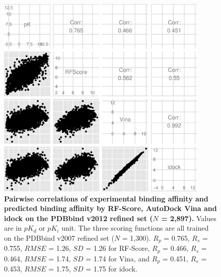 \documentclass[10pt]{article}
\begin{document}
\begin{figure}[!ht]
\begin{center}
\includegraphics[width=4in]{../istar/PDBbind2012Correlations.eps}
\end{center}
\caption{
{\bf Pairwise correlations of experimental binding affinity and predicted binding affinity by RF-Score, AutoDock Vina and idock on the PDBbind v2012 refined set ($N$ = 2,897).} Values are in $pK_d$ or $pK_i$ unit. The three scoring functions are all trained on the PDBbind v2007 refined set ($N$ = 1,300). $R_p$ = 0.765, $R_s$ = 0.755, $RMSE$ = 1.26, $SD$ = 1.26 for RF-Score, $R_p$ = 0.466, $R_s$ = 0.464, $RMSE$ = 1.74, $SD$ = 1.74 for Vina, and $R_p$ = 0.451, $R_s$ = 0.453, $RMSE$ = 1.75, $SD$ = 1.75 for idock.
}
\label{PDBbind2012Correlations}
\end{figure}
\end{document}
